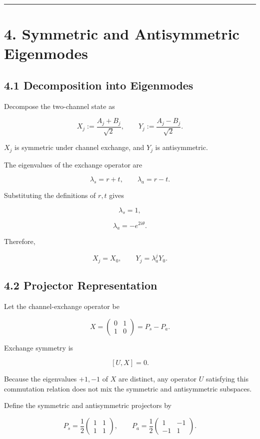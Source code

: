 \documentclass[
  a4paper,
  10pt]{article}
\begin{document}
\begin{center}\rule{0.5\linewidth}{0.5pt}\end{center}

\section{4. Symmetric and Antisymmetric
Eigenmodes}\label{4-symmetric-and-antisymmetric-eigenmodes}

\subsection{4.1 Decomposition into
Eigenmodes}\label{41-decomposition-into-eigenmodes}

Decompose the two-channel state as

\[
X_j:=\frac{A_j+B_j}{\sqrt2},
\qquad
Y_j:=\frac{A_j-B_j}{\sqrt2}.
\]

\(X_j\) is symmetric under channel exchange, and \(Y_j\) is
antisymmetric.

The eigenvalues of the exchange operator are

\[
\lambda_s=r+t,
\qquad
\lambda_a=r-t.
\]

Substituting the definitions of \(r,t\) gives

\[
\lambda_s=1,
\]

\[
\lambda_a=-e^{2i\theta}.
\]

Therefore,

\[
X_j=X_0,
\qquad
Y_j=\lambda_a^jY_0.
\]

\subsection{4.2 Projector
Representation}\label{42-projector-representation}

Let the channel-exchange operator be

\[
X=
\begin{pmatrix}
0&1\\
1&0
\end{pmatrix}
=P_s-P_a.
\]

Exchange symmetry is

\[
[U,X]=0.
\]

Because the eigenvalues \(+1,-1\) of \(X\) are distinct, any operator
\(U\) satisfying this commutation relation does not mix the symmetric
and antisymmetric subspaces.

Define the symmetric and antisymmetric projectors by

\[
P_s=
\frac12
\begin{pmatrix}
1&1\\
1&1
\end{pmatrix},
\qquad
P_a=
\frac12
\begin{pmatrix}
1&-1\\
-1&1
\end{pmatrix}.
\]
\end{document}
